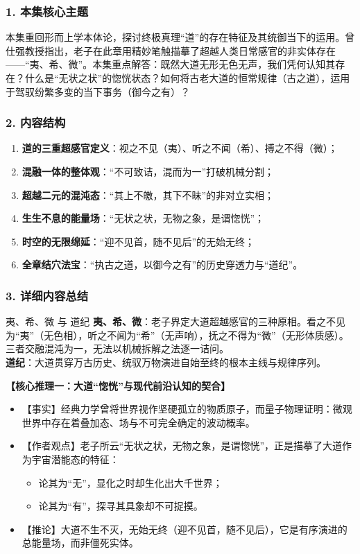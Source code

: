 \subsubsection{1. 本集核心主题}
本集重回形而上学本体论，探讨终极真理“道”的存在特征及其统御当下的运用。曾仕强教授指出，老子在此章用精妙笔触描摹了超越人类日常感官的非实体存在——“夷、希、微”。本集重点解答：既然大道无形无色无声，我们凭何认知其存在？什么是“无状之状”的惚恍状态？如何将古老大道的恒常规律（古之道），运用于驾驭纷繁多变的当下事务（御今之有）？

\subsubsection{2. 内容结构}
\begin{enumerate}
    \item \textbf{道的三重超感官定义}：视之不见（夷）、听之不闻（希）、搏之不得（微）；
    \item \textbf{混融一体的整体观}：“不可致诘，混而为一”打破机械分割；
    \item \textbf{超越二元的混沌态}：“其上不皦，其下不昧”的非对立实相；
    \item \textbf{生生不息的能量场}：“无状之状，无物之象，是谓惚恍”；
    \item \textbf{时空的无限绵延}：“迎不见首，随不见后”的无始无终；
    \item \textbf{全章结穴法宝}：“执古之道，以御今之有”的历史穿透力与“道纪”。
\end{enumerate}

\subsubsection{3. 详细内容总结}

\begin{ConceptBox}{夷、希、微 与 道纪}
\textbf{夷、希、微}：老子界定大道超越感官的三种原相。看之不见为“夷”（无色相），听之不闻为“希”（无声响），抚之不得为“微”（无形体质感）。三者交融混沌为一，无法以机械拆解之法逐一诘问。\\
\textbf{道纪}：大道贯穿万古历史、统驭万物演进自始至终的根本主线与规律序列。
\end{ConceptBox}

\noindent\textbf{【核心推理一：大道“惚恍”与现代前沿认知的契合】}
\begin{itemize}
    \item 【事实】经典力学曾将世界视作坚硬孤立的物质原子，而量子物理证明：微观世界中存在着叠加态、场与不可完全确定的波动概率。
    \item 【作者观点】老子所云“无状之状，无物之象，是谓惚恍”，正是描摹了大道作为宇宙潜能态的特征：
    \begin{itemize}
        \item 论其为“无”，显化之时却生化出大千世界；
        \item 论其为“有”，探寻其具象却不可捉摸。
    \end{itemize}
    \item 【推论】大道不生不灭，无始无终（迎不见首，随不见后），它是有序演进的总能量场，而非僵死实体。
\end{itemize}

